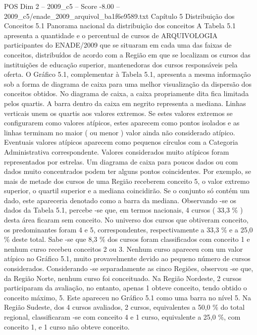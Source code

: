 \begin{textsample}{POS Dim 2 – 2009\_c5 – Score -8.00 – 2009\_c5/enade\_2009\_arquivol\_ba1f6e9589.txt}  \label{ex:f2_pos_422}
Capítulo 5 Distribuição dos Conceitos 5.1 Panorama nacional da distribuição dos conceitos A Tabela 5.1 apresenta a quantidade e o percentual de cursos de ARQUIVOLOGIA participantes do ENADE/2009 que se situaram em cada uma das faixas de conceitos, distribuídos de acordo com a Região em que se localizam os cursos das instituições de educação superior, mantenedoras dos cursos responsáveis pela oferta.
O Gráfico 5.1, complementar à Tabela 5.1, apresenta a mesma informação sob a forma de diagrama de caixa para uma melhor visualização da dispersão dos conceitos obtidos.
No diagrama de caixa, a caixa propriamente dita fica limitada pelos quartis.
A barra dentro da caixa em negrito representa a mediana.
Linhas verticais unem os quartis aos valores extremos.
Se estes valores extremos se configurarem como valores atípicos, estes aparecem como pontos isolados e as linhas terminam no maior ( ou menor ) valor ainda não considerado atípico.
Eventuais valores atípicos aparecem como pequenos círculos com a Categoria Administrativa correspondente.
Valores considerados muito atípicos foram representados por estrelas.
Um diagrama de caixa para poucos dados ou com dados muito concentrados podem ter alguns pontos coincidentes.
Por exemplo, se mais de metade dos cursos de uma Região receberem conceito 5, o valor extremo superior, o quartil superior e a mediana coincidirão.
Se o conjunto só contém um dado, este apareceria denotado como a barra da mediana.
Observando -se os dados da Tabela 5.1, percebe -se que, em termos nacionais, 4 cursos ( 33,3 \% ) desta área ficaram sem conceito.
No universo dos cursos que obtiveram conceito, os predominantes foram 4 e 5, correspondentes, respectivamente a 33,3 \% e a 25,0 \% deste total.
Sabe -se que 8,3 \% dos cursos foram classificados com conceito 1 e nenhum curso recebeu conceitos 2 ou 3.
Nenhum curso apareceu com um valor atípico no Gráfico 5.1, muito provavelmente devido ao pequeno número de cursos considerados.
Considerando -se separadamente as cinco Regiões, observou -se que, da Região Norte, nenhum curso foi conceituado.
Na Região Nordeste, 2 cursos participaram da avaliação, no entanto, apenas 1 obteve conceito, tendo obtido o conceito máximo, 5.
Este apareceu no Gráfico 5.1 como uma barra no nível 5.
Na Região Sudeste, dos 4 cursos avaliados, 2 cursos, equivalentes a 50,0 \% do total regional, classificaram -se com conceito 4 e 1 curso, equivalente a 25,0 \%, com conceito 1, e 1 curso não obteve conceito.

\end{textsample}
